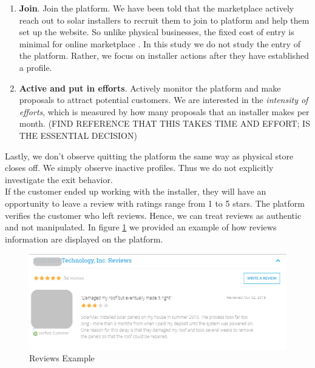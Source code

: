 \documentclass[msom,blindrev]{informs3}
\begin{document}
\begin{enumerate}
\item  \textbf{Join}. Join the platform. We have been told that the marketplace actively reach out to solar installers to recruit them to join to platform and help them set up the website. So unlike physical businesses, the fixed cost of entry is minimal for online marketplace \citep{haddad2015consumer}. In this study we do not study the entry of the platform. Rather, we focus on installer actions after they have established a profile.  \\
\item  \textbf{Active and put in efforts}. Actively monitor the platform and make proposals to attract potential customers. We are interested in the\textit{ intensity of efforts}, which is measured by how many proposals that an installer makes per month. (FIND REFERENCE THAT THIS TAKES TIME AND EFFORT; IS THE ESSENTIAL DECISION)\\
\end{enumerate}

Lastly, we don't observe quitting the platform the same way as physical store closes off. We simply observe inactive profiles. Thus we do not explicitly investigate the exit behavior. \\ 


If the customer ended up working with the installer, they will have an opportunity to leave a review with ratings range from 1 to 5 stars. The platform verifies the customer who left reviews. Hence, we can treat reviews as authentic and not manipulated. In figure \ref{reviews_example} we provided an example of how reviews information are displayed on the platform.
\begin{figure}
	\centering
	\includegraphics[width=0.81\linewidth]{reviews_example.png}
	\caption{Reviews Example}
	\label{reviews_example}
\end{figure}
\end{document}
